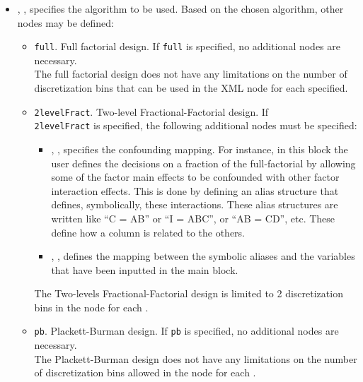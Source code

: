    \begin{itemize}
    \item {}, , specifies the
      algorithm to be used.
      Based on the chosen algorithm, other nodes may be defined:
      \begin{itemize}
        \item {}\texttt{full}. Full factorial design.
          If \texttt{full} is specified, no additional nodes are necessary.
          \\
          \nb The full factorial design does not have any limitations on the
          number of discretization bins that can be used in the 
          XML node for each  specified.
        \item {}\texttt{2levelFract}. Two-level
          Fractional-Factorial design.
          If \\\texttt{2levelFract}  is specified, the following additional
          nodes must be specified:
          \begin{itemize}
            \item {}, , specifies the confounding mapping.
              For instance, in this block the user defines the decisions on a
              fraction of the full-factorial by allowing some of the factor main
              effects to be confounded with other factor interaction effects.
              This is done by defining an alias structure that defines,
              symbolically, these interactions.
              These alias structures are written like “C = AB” or “I = ABC”, or
              “AB = CD”, etc.
              These define how a column is related to the others.
            \item {}, , defines the mapping between the  symbolic
              aliases and the variables that have been inputted in the
               main block.
          \end{itemize}
          \nb The Two-levels Fractional-Factorial design is limited to 2
          discretization bins in the  node for each
          .
       \item {}\texttt{pb}. Plackett-Burman design.
         If \texttt{pb} is specified, no additional nodes are necessary.
         \\ 
         \nb The Plackett-Burman design does not have any limitations on the
         number of discretization bins allowed in the  node for
         each .
      \end{itemize}
   
  \end{itemize}

